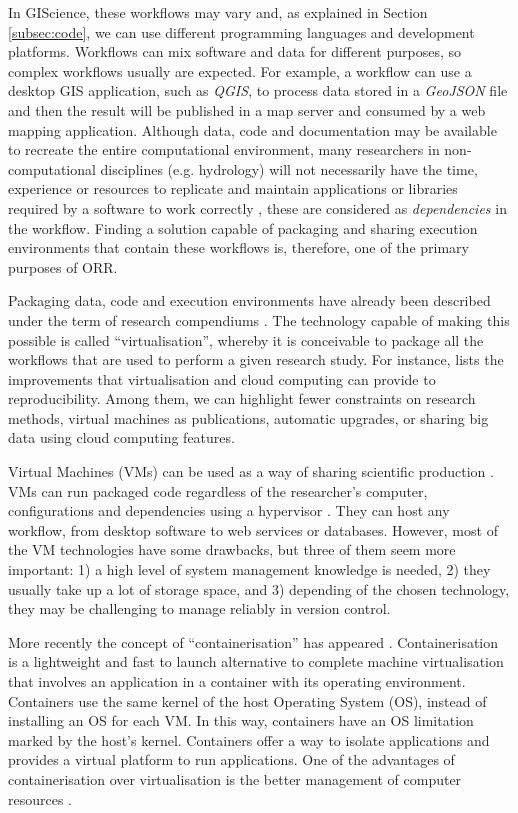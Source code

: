 \documentclass[ijgi,article,submit,moreauthors,pdftex]{Definitions/mdpi}
\begin{document}
In GIScience, these workflows may vary and, as explained in Section \ref{subsec:code}, we can use different programming languages and development platforms. Workflows can mix software and data for different purposes, so complex workflows usually are expected. For example, a workflow can use a desktop GIS application, such as \textit{QGIS}, to process data stored in a \textit{GeoJSON} file and then the result will be published in a map server and consumed by a web mapping application. Although data, code and documentation may be available to recreate the entire computational environment, many researchers in non-computational disciplines (e.g. hydrology) will not necessarily have the time, experience or resources to replicate and maintain applications or libraries required by a software to work correctly \cite{hutton2016most}, these are considered as \textit{dependencies} in the workflow. Finding a solution capable of packaging and sharing execution environments that contain these workflows is, therefore, one of the primary purposes of ORR.

Packaging data, code and execution environments have already been described under the term of research compendiums \cite{chirigati2016reprozip, stodden2015researchcompendia}. The technology capable of making this possible is called ``virtualisation'', whereby it is conceivable to package all the workflows that are used to perform a given research study. For instance, \cite{howe2012virtual} lists the improvements that virtualisation and cloud computing can provide to reproducibility. Among them, we can highlight fewer constraints on research methods, virtual machines as publications, automatic upgrades, or sharing big data using cloud computing features.

Virtual Machines (VMs) can be used as a way of sharing scientific production \cite{dua2014virtualization}. VMs can run packaged code regardless of the researcher's computer, configurations and dependencies using a hypervisor \cite{soltesz2007container}. They can host any workflow, from desktop software to web services or databases. However, most of the VM technologies have some drawbacks, but three of them seem more important: 1) a high level of system management knowledge is needed, 2) they usually take up a lot of storage space, and 3) depending of the chosen technology, they may be challenging to manage reliably in version control.

More recently the concept of ``containerisation'' has appeared \cite{turnbull2014docker}. Containerisation is a lightweight and fast to launch alternative to complete machine virtualisation that involves an application in a container with its operating environment. Containers use the same kernel of the host Operating System (OS), instead of installing an OS for each VM. In this way, containers have an OS limitation marked by the host's kernel. Containers offer a way to isolate applications and provides a virtual platform to run applications. One of the advantages of containerisation over virtualisation is the better management of computer resources \cite{meadusani2018virtualization}.
\end{document}
